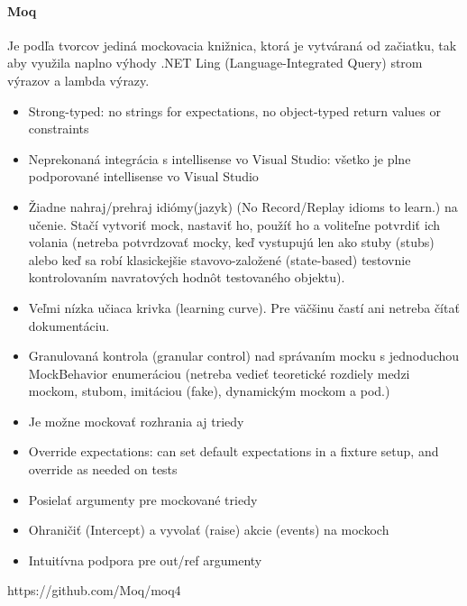 \documentclass[11pt,twoside,slovak,a4paper]{article}
\begin{document}
			\paragraph{Moq} Je podľa tvorcov jediná mockovacia knižnica, ktorá je vytváraná od začiatku, tak aby využila naplno výhody .NET Ling (Language-Integrated Query) strom výrazov a lambda výrazy.
			\begin{itemize}
				\item Strong-typed: no strings for expectations, no object-typed return values or constraints
				\item Neprekonaná integrácia s intellisense vo Visual Studio: všetko je plne podporované intellisense vo Visual Studio
				\item Žiadne nahraj/prehraj idiómy(jazyk) (No Record/Replay idioms to learn.) na učenie. Stačí vytvoriť mock, nastaviť ho, použíť ho a voliteľne potvrdiť ich volania (netreba potvrdzovať mocky, keď vystupujú len ako stuby (stubs) alebo keď sa robí klasickejšie stavovo-založené (state-based) testovnie kontrolovaním navratových hodnôt testovaného objektu).
				\item Veľmi nízka učiaca krivka (learning curve). Pre väčšinu častí ani netreba čítať dokumentáciu.
				\item Granulovaná kontrola (granular control) nad správaním mocku s jednoduchou MockBehavior enumeráciou (netreba vedieť teoretické rozdiely medzi mockom, stubom, imitáciou (fake), dynamickým mockom a pod.)
				\item Je možne mockovať rozhrania aj triedy
				\item Override expectations: can set default expectations in a fixture setup, and override as needed on tests
				\item Posielať argumenty pre mockované triedy
				\item Ohraničiť (Intercept) a vyvolať (raise) akcie (events) na mockoch
				\item Intuitívna podpora pre out/ref argumenty
			\end{itemize}
			https://github.com/Moq/moq4
			

			
			
			
	
	
	
	
\end{document}
